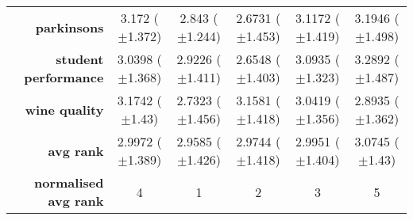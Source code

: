 \begin{table}[htbp]
{\begin{tabular}{r|ccccc}
			\textbf{parkinsons}          & \cellcolor[rgb]{ .984,  .561,  .451}3.172 ($\pm$1.372)  & \cellcolor[rgb]{ .62,  .812,  .494}2.843 ($\pm$1.244)   & \cellcolor[rgb]{ .388,  .745,  .482}2.6731 ($\pm$1.453) & \cellcolor[rgb]{ 1,  .922,  .518}3.1172 ($\pm$1.419)    & \cellcolor[rgb]{ .973,  .412,  .42}3.1946 ($\pm$1.498)  \\
			\textbf{student performance} & \cellcolor[rgb]{ 1,  .922,  .518}3.0398 ($\pm$1.368)    & \cellcolor[rgb]{ .812,  .867,  .506}2.9226 ($\pm$1.411) & \cellcolor[rgb]{ .388,  .745,  .482}2.6548 ($\pm$1.403) & \cellcolor[rgb]{ .996,  .812,  .498}3.0935 ($\pm$1.323) & \cellcolor[rgb]{ .973,  .412,  .42}3.2892 ($\pm$1.487)  \\
			\textbf{wine quality}        & \cellcolor[rgb]{ .973,  .412,  .42}3.1742 ($\pm$1.43)   & \cellcolor[rgb]{ .388,  .745,  .482}2.7323 ($\pm$1.456) & \cellcolor[rgb]{ .976,  .475,  .435}3.1581 ($\pm$1.418) & \cellcolor[rgb]{ 1,  .922,  .518}3.0419 ($\pm$1.356)    & \cellcolor[rgb]{ .706,  .835,  .498}2.8935 ($\pm$1.362) \\
			\midrule
			\textbf{avg rank}            & \cellcolor[rgb]{ 1,  .91,  .518}2.9972 ($\pm$1.389)     & \cellcolor[rgb]{ .388,  .745,  .482}2.9585 ($\pm$1.426) & \cellcolor[rgb]{ .651,  .82,  .494}2.9744 ($\pm$1.418)  & \cellcolor[rgb]{ 1,  .922,  .518}2.9951 ($\pm$1.404)    & \cellcolor[rgb]{ .973,  .412,  .42}3.0745 ($\pm$1.43)   \\
			\midrule
			\textbf{normalised avg rank} & \cellcolor[rgb]{ .988,  .667,  .471}4                   & \cellcolor[rgb]{ .388,  .745,  .482}1                   & \cellcolor[rgb]{ .694,  .831,  .498}2                   & \cellcolor[rgb]{ 1,  .922,  .518}3                      & \cellcolor[rgb]{ .973,  .412,  .42}5                    \\
		\end{tabular}%

	}
\end{table}%


